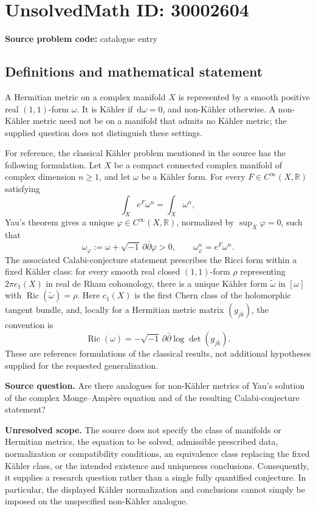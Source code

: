 \documentclass[11pt]{article}
\newcommand{\R}{\mathbb{R}}
\newcommand{\dd}{\,\mathrm{d}}
\begin{document}
\section*{UnsolvedMath ID: 30002604}
\textbf{Source problem code:} catalogue entry
\subsection{Definitions and mathematical statement}
A Hermitian metric on a complex manifold \(X\) is represented by a smooth positive real \((1,1)\)-form \(\omega\). It is K\"ahler if \(\dd\omega=0\), and non-K\"ahler otherwise. A non-K\"ahler metric need not be on a manifold that admits no K\"ahler metric; the supplied question does not distinguish these settings.

For reference, the classical K\"ahler problem mentioned in the source has the following formulation. Let \(X\) be a compact connected complex manifold of complex dimension \(n\geq 1\), and let \(\omega\) be a K\"ahler form. For every \(F\in C^\infty(X,\R)\) satisfying
\[
\int_X e^F\omega^n=\int_X\omega^n,
\]
Yau's theorem gives a unique \(\varphi\in C^\infty(X,\R)\), normalized by \(\sup_X\varphi=0\), such that
\[
\omega_\varphi:=\omega+\sqrt{-1}\,\partial\bar\partial\varphi>0,
\qquad
\omega_\varphi^n=e^F\omega^n.
\]
The associated Calabi-conjecture statement prescribes the Ricci form within a fixed K\"ahler class: for every smooth real closed \((1,1)\)-form \(\rho\) representing \(2\pi c_1(X)\) in real de Rham cohomology, there is a unique K\"ahler form \(\widetilde\omega\) in \([\omega]\) with \(\operatorname{Ric}(\widetilde\omega)=\rho\). Here \(c_1(X)\) is the first Chern class of the holomorphic tangent bundle, and, locally for a Hermitian metric matrix \((g_{j\bar k})\), the convention is
\[
\operatorname{Ric}(\omega)=-\sqrt{-1}\,\partial\bar\partial\log\det(g_{j\bar k}).
\]
These are reference formulations of the classical results, not additional hypotheses supplied for the requested generalization.

\textbf{Source question.} Are there analogues for non-K\"ahler metrics of Yau's solution of the complex Monge--Amp\`ere equation and of the resulting Calabi-conjecture statement?

\textbf{Unresolved scope.} The source does not specify the class of manifolds or Hermitian metrics, the equation to be solved, admissible prescribed data, normalization or compatibility conditions, an equivalence class replacing the fixed K\"ahler class, or the intended existence and uniqueness conclusions. Consequently, it supplies a research question rather than a single fully quantified conjecture. In particular, the displayed K\"ahler normalization and conclusions cannot simply be imposed on the unspecified non-K\"ahler analogue.
\end{document}
